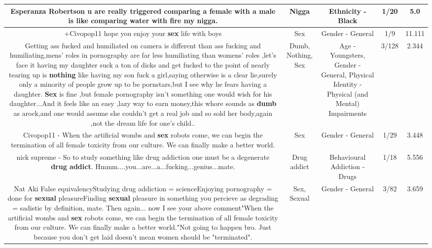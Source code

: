 \documentclass[11pt]{article}
\newlength\mylength
\begin{document}
\begin{center}
\begin{longtable}{|C{.65\mylength}|C{.30\mylength}|C{.12\mylength}|C{.12\mylength}|C{.12\mylength}|}
  \small Esperanza Robertson u are really triggered comparing a female with a male is like comparing water with fire my \textbf{nigga}.\normalsize   & Nigga & Ethnicity - Black & 1/20 & 5.0 \\  \hline
  \small +Civopop11 hope you enjoy your \textbf{sex} life with boys\normalsize   & Sex & Gender - General & 1/9 & 11.111 \\  \hline
  \small Getting ass fucked and humiliated on camera is different than ass fucking and humiliating,mens' roles in pornography are far less humiliating than womens' roles ,let's face it having my daughter suck a ton of dicks and get fucked to the point of nearly tearing up is \textbf{nothing} like having my son fuck a girl,saying otherwise is a clear lie,surely only a minority of people grow up to be pornstars,but I see why he fears having a daughter. \textbf{Sex} is fine ,but female pornography isn't something one would wish for his daughter...And it feels like an easy ,lazy way to earn money,this whore sounds as \textbf{dumb} as arock,and one would assume she couldn't get a real job and so sold her body,again ,not the dream life for one's child..\normalsize   & Dumb, Nothing, Sex & Age - Youngsters, Gender - General, Physical Identity - Physical (and Mental) Impairments & 3/128 & 2.344 \\  \hline
  \small Civopop11 - When the artificial wombs and \textbf{sex} robots come, we can begin the termination of all female toxicity from our culture.  We can finally make a better world.\normalsize   & Sex & Gender - General & 1/29 & 3.448 \\  \hline
  \small nick supreme - So to study something like drug addiction one must be a degenerate \textbf{drug addict}.  Hmmm....you...are...a...fucking...genius...mate.\normalsize   & Drug addict & Behavioural Addiction - Drugs & 1/18 & 5.556 \\  \hline
  \small Nat Aki False equivalencyStudying drug addiction = scienceEnjoying pornography = done for \textbf{sexual} pleasureFinding \textbf{sexual} pleasure in something you percieve as degrading = sadistic by definition, mate. Then again... now I see your above comment"When the artificial wombs and \textbf{sex} robots come, we can begin the termination of all female toxicity from our culture.  We can finally make a better world."Not going to happen bro. Just because you don't get laid doesn't mean women should be "terminated".\normalsize   & Sex, Sexual & Gender - General & 3/82 & 3.659 \\  \hline

\end{longtable}
\end{center}
\end{document}

